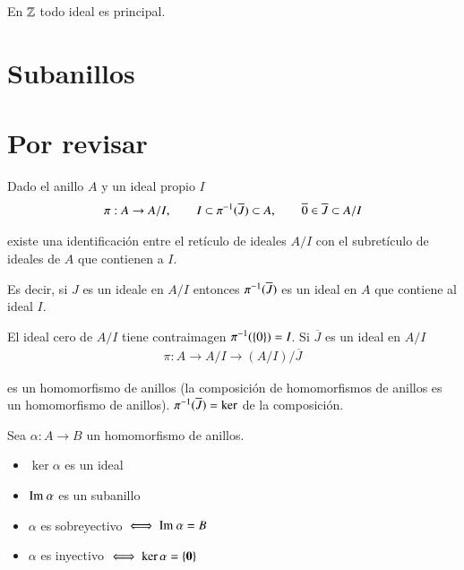 \begin{obs}
	En $\mathbb{Z}$ todo ideal es principal.
\end{obs}

\section{Subanillos}


\section{Por revisar}


\begin{thm}
	Dado el anillo $A$ y un ideal propio $I$
	\begin{align*}
		\pi: A \to A/I,\qquad I \subset \pi^{-1}(\overline{J}) \subset A,\qquad \overline{0} \in \overline{J} \subset A / I
	\end{align*}
	
	existe una identificación entre el retículo de ideales $A / I$ con el subretículo de ideales de $A$ que contienen a $I$. 
	
	Es decir, si $J$ es un ideale en $A/I$ entonces $\pi^{-1}(\overline{J})$ es un ideal en $A$ que contiene al ideal $I$.
\end{thm}


El ideal cero de $A/I$ tiene contraimagen $\pi^{-1}(\{0\}) = I$. Si $\overline{J}$ es un ideal en $A/I$
\begin{align*}
	\pi : A \to A/I \to (A/I) / \overline{J}
\end{align*}

es un homomorfismo de anillos (la composición de homomorfismos de anillos es un homomorfismo de anillos). $\pi^{-1}(\overline{J}) = \ker$ de la composición.


\begin{thm}
	Sea $\alpha: A \to B$ un homomorfismo de anillos.
	\begin{itemize}
		\item $\ker \alpha$ es un ideal
		\item $\text{Im } \alpha$ es un subanillo
		\item $\alpha$ es sobreyectivo $\iff \text{Im } \alpha = B$
		\item $\alpha$ es inyectivo $\iff \ker \alpha = \{\mathbf{0}\}$
	\end{itemize}
\end{thm}

